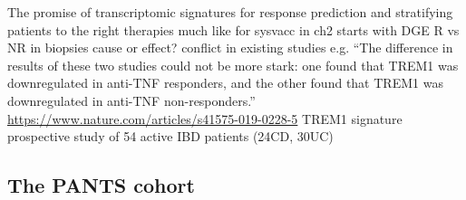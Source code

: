 \begin{outline}
\1 The promise of transcriptomic signatures for response prediction and stratifying patients to the right therapies
    \2 much like for sysvacc in ch2
    \2 starts with DGE R vs NR in biopsies
    \2 cause or effect?
    \2 conflict in existing studies e.g. \enquote{The difference in results of these two studies could not be more stark: one found that TREM1 was downregulated in anti-TNF responders, and the other found that TREM1 was downregulated in anti-TNF non-responders.} \url{https://www.nature.com/articles/s41575-019-0228-5}
    \2 TREM1 signature \autocite{verstockt2019LowTREM1Expression}
        \2 prospective study of 54 active IBD patients (24CD, 30UC)

\subsection{The PANTS cohort}


\end{outline}
